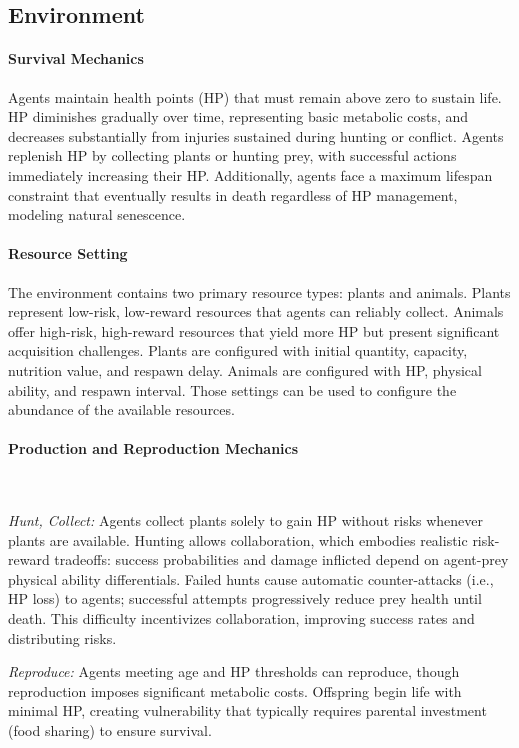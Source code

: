 \documentclass[letterpaper]{article} %
\begin{document}
\subsection{Environment}

\paragraph{Survival Mechanics}
Agents maintain health points (HP) that must remain above zero to sustain life. HP diminishes gradually over time, representing basic metabolic costs, and decreases substantially from injuries sustained during hunting or conflict. Agents replenish HP by collecting plants or hunting prey, with successful actions immediately increasing their HP. Additionally, agents face a maximum lifespan constraint that eventually results in death regardless of HP management, modeling natural senescence.

\paragraph{Resource Setting}
The environment contains two primary resource types: plants and animals. Plants represent low-risk, low-reward resources that agents can reliably collect. Animals offer high-risk, high-reward resources that yield more HP but present significant acquisition challenges. 
Plants are configured with initial quantity, capacity, nutrition value, and respawn delay.
Animals are configured with HP, physical ability, and respawn interval.
Those settings can be used to configure the abundance of the available resources.

\paragraph{Production and Reproduction Mechanics}\

\textit{Hunt, Collect:} Agents collect plants solely to gain HP without risks whenever plants are available. Hunting allows collaboration, which embodies realistic risk-reward tradeoffs: success probabilities and damage inflicted depend on agent-prey physical ability differentials. Failed hunts cause automatic counter-attacks (i.e., HP loss) to agents; successful attempts progressively reduce prey health until death. This difficulty incentivizes collaboration, improving success rates and distributing risks.

\textit{Reproduce:} Agents meeting age and HP thresholds can reproduce, though reproduction imposes significant metabolic costs. Offspring begin life with minimal HP, creating vulnerability that typically requires parental investment (food sharing) to ensure survival.
\end{document}
